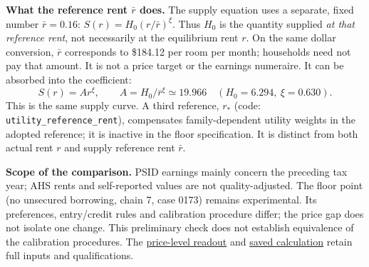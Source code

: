 \documentclass[11pt,letterpaper]{article}
\begin{document}
\textbf{What the reference rent $\bar r$ does.} The supply equation uses a
separate, fixed number $\bar r=0.16$: $S(r)=H_0(r/\bar r)^\xi$. Thus $H_0$ is
the quantity supplied \emph{at that reference rent}, not necessarily at the
equilibrium rent $r$. On the same dollar conversion, $\bar r$ corresponds to
\$184.12 per room per month; households need not pay that amount. It is not a
price target or the earnings numeraire. It can be absorbed into the coefficient:
\[
 S(r)=Ar^\xi,\qquad A=H_0/\bar r^{\xi}\simeq19.966
 \quad(H_0=6.294,\ \xi=0.630).
\]
This is the same supply curve. A third reference, $r_*$ (code:
\texttt{utility\_reference\_rent}), compensates family-dependent utility weights
in the adopted reference; it is inactive in the floor specification. It is
distinct from both actual rent $r$ and supply reference rent $\bar r$.

\textbf{Scope of the comparison.} PSID earnings mainly concern the preceding
tax year; AHS rents and self-reported values are not quality-adjusted. The floor
point (no unsecured borrowing, chain 7, case 0173) remains experimental. Its preferences,
entry/credit rules and calibration procedure differ; the price gap does not
isolate one change. This preliminary check does not establish equivalence of
the calibration procedures. The
\href{price_level_readout.md}{price-level readout} and
\href{price_level_comparison.json}{saved calculation} retain full inputs and
qualifications.
\endgroup
\end{document}
